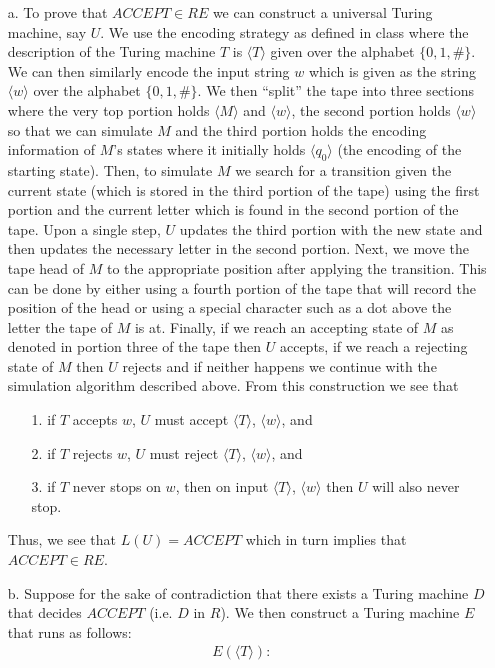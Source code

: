 \documentclass [10pt]{article}
\begin{document}
\begin{enumerate}
\begin{enumerate}
		\item[a.]To prove that $ACCEPT\in RE$ we can construct a universal Turing machine, say $U$. We use the encoding strategy as defined in class where the description of the Turing machine $T$ is $\langle T\rangle$ given over the alphabet $\{0,1,\#\}$. We can then similarly encode the input string $w$ which is given as the string $\langle w\rangle$ over the alphabet $\{0,1,\#\}$. We then ``split'' the tape into three sections where the very top portion holds $\langle M\rangle$ and $\langle w\rangle$, the second portion holds $\langle w\rangle$ so that we can simulate $M$ and the third portion holds the encoding information of $M$'s states where it initially holds $\langle q_{0}\rangle$ (the encoding of the starting state). Then, to simulate $M$ we search for a transition given the current state (which is stored in the third portion of the tape) using the first portion and the current letter which is found in the second portion of the tape. Upon a single step, $U$ updates the third portion with the new state and then updates the necessary letter in the second portion. Next, we move the tape head of $M$ to the appropriate position after applying the transition. This can be done by either using a fourth portion of the tape that will record the position of the head or using a special character such as a dot above the letter the tape of $M$ is at. Finally, if we reach an accepting state of $M$ as denoted in portion three of the tape then $U$ accepts, if we reach a rejecting state of $M$ then $U$ rejects and if neither happens we continue with the simulation algorithm described above. From this construction we see that
		\begin{enumerate}
			\item[1.]if $T$ accepts $w$, $U$ must accept $\langle T\rangle$, $\langle w\rangle$, and
			\item[2.]if $T$ rejects $w$, $U$ must reject $\langle T\rangle$, $\langle w\rangle$, and
			\item[3.]if $T$ never stops on $w$, then on input $\langle T\rangle$, $\langle w\rangle$ then $U$ will also never stop.
		\end{enumerate}
		Thus, we see that $L(U)=ACCEPT$ which in turn implies that $ACCEPT\in RE$.
		\item[b.]Suppose for the sake of contradiction that there exists a Turing machine $D$ that decides $ACCEPT$ (i.e. $D$ in $R$). We then construct a Turing machine $E$ that runs as follows:
		\begin{align}
			E(\langle T\rangle):&\nonumber\\

\end{align}
\end{enumerate}
\end{enumerate}
\end{document}
